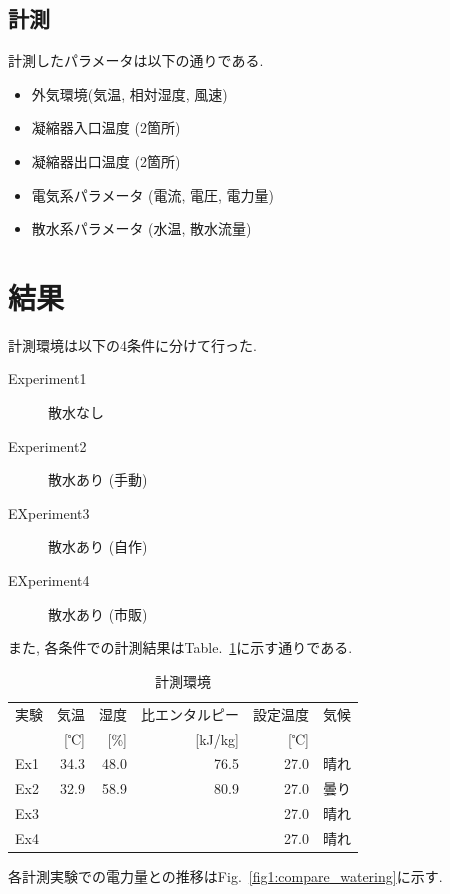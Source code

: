 \documentclass[a4j,fleqn,dvipdfmx,uplatex]{jsarticle}
\newcommand{\figref}[1]{Fig.\ \ref{#1}}
\newcommand{\tableref}[1]{Table.\ \ref{#1}}
\begin{document}
\subsection{計測}
計測したパラメータは以下の通りである. 

\begin{itemize}
  \item 外気環境(気温, 相対湿度, 風速)
  \item 凝縮器入口温度 (2箇所)
  \item 凝縮器出口温度 (2箇所)
  \item 電気系パラメータ (電流, 電圧, 電力量)
  \item 散水系パラメータ (水温, 散水流量)
\end{itemize}


\section{結果}\label{sec3}
計測環境は以下の4条件に分けて行った. 

\begin{description}
  \item[  Experiment1] 散水なし
  \item[  Experiment2] 散水あり (手動)
  \item[  EXperiment3] 散水あり (自作)
  \item[  EXperiment4] 散水あり (市販)
\end{description}

また, 各条件での計測結果は\tableref{table:ex}に示す通りである. 

\begin{table}[htb]
  \caption{計測環境}
  \label{table:ex}
  \centering
  \begin{tabular}{lrrrrr}
    実験 & 気温 & 湿度 & \small 比エンタルピー & \small 設定温度 & 気候 \\
     & [℃] & [\%] & [kJ/kg] & [℃] &  \\
    \hline \hline
    Ex1 & 34.3 & 48.0 & 76.5 & 27.0 & 晴れ  \\
    Ex2 & 32.9 & 58.9 & 80.9 & 27.0 & 曇り \\
    Ex3 &  &  &  & 27.0 & 晴れ \\
    Ex4 &  &  &  & 27.0 & 晴れ \\
    \hline
  \end{tabular}
\end{table}

各計測実験での電力量との推移は\figref{fig1:compare_watering}に示す. 
\end{document}
